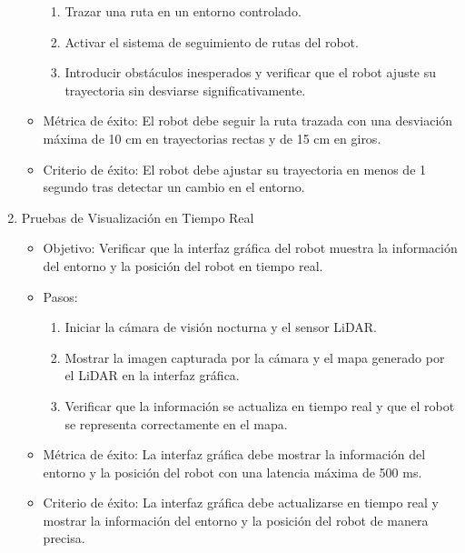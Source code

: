 \begin{enumerate}
\begin{itemize}
\begin{enumerate}
                    \item Trazar una ruta en un entorno controlado.
                    \item Activar el sistema de seguimiento de rutas del robot.
                    \item Introducir obst\'aculos inesperados y verificar que el robot ajuste
                        su trayectoria sin desviarse significativamente.
                \end{enumerate}
            \item M\'etrica de \'exito: El robot debe seguir la ruta trazada con una desviaci\'on
                m\'axima de 10 cm en trayectorias rectas y de 15 cm en giros.
            \item Criterio de \'exito: El robot debe ajustar su trayectoria en menos de 1
                segundo tras detectar un cambio en el entorno.
        \end{itemize}
        \item Pruebas de Visualizaci\'on en Tiempo Real
        \begin{itemize}
            \item Objetivo: Verificar que la interfaz gr\'afica del robot muestra la
                informaci\'on del entorno y la posici\'on del robot en tiempo real.
            \item Pasos:
                \begin{enumerate}
                    \item Iniciar la c\'amara de visi\'on nocturna y el sensor LiDAR.
                    \item Mostrar la imagen capturada por la c\'amara y el mapa generado por
                        el LiDAR en la interfaz gr\'afica.
                    \item Verificar que la informaci\'on se actualiza en tiempo real y que el
                        robot se representa correctamente en el mapa.
                \end{enumerate}
            \item M\'etrica de \'exito: La interfaz gr\'afica debe mostrar la informaci\'on del
                entorno y la posici\'on del robot con una latencia m\'axima de 500 ms.
            \item Criterio de \'exito: La interfaz gr\'afica debe actualizarse en tiempo real y
                mostrar la informaci\'on del entorno y la posici\'on del robot de manera precisa.
        \end{itemize}
    \end{enumerate}